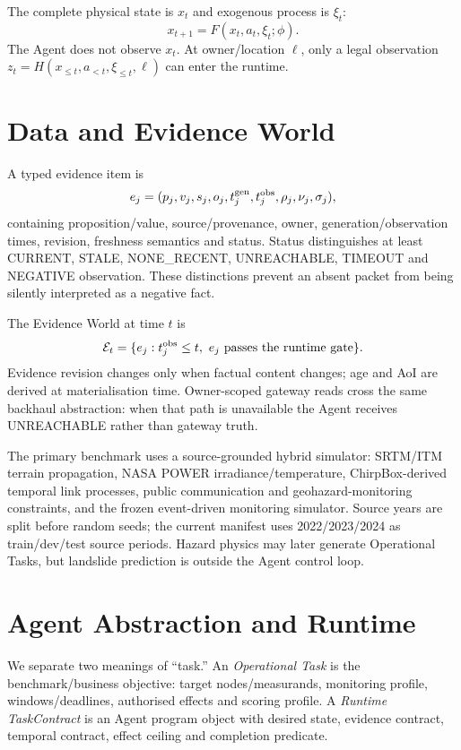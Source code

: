 \documentclass[journal,10pt]{IEEEtran}
\begin{document}
The complete physical state is $x_t$ and exogenous process is $\xi_t$:
\begin{equation}
x_{t+1}=F(x_t,a_t,\xi_t;\phi).
\label{eq:physics}
\end{equation}
The Agent does not observe $x_t$. At owner/location $\ell$, only a legal observation
$z_t=H(x_{\le t},a_{<t},\xi_{\le t},\ell)$ can enter the runtime.

\section{Data and Evidence World}
\label{sec:evidence}
A typed evidence item is
\begin{equation}
e_j=(p_j,v_j,s_j,o_j,t_j^{\rm gen},t_j^{\rm obs},\rho_j,\nu_j,\sigma_j),
\label{eq:evidence}
\end{equation}
containing proposition/value, source/provenance, owner, generation/observation times, revision,
freshness semantics and status. Status distinguishes at least CURRENT, STALE, NONE\_RECENT,
UNREACHABLE, TIMEOUT and NEGATIVE observation. These distinctions prevent an absent packet from
being silently interpreted as a negative fact.

The Evidence World at time $t$ is
\begin{equation}
\mathcal E_t=\{e_j:t_j^{\rm obs}\le t,\ e_j\text{ passes the runtime gate}\}.
\end{equation}
Evidence revision changes only when factual content changes; age and AoI are derived at
materialisation time. Owner-scoped gateway reads cross the same backhaul abstraction: when that
path is unavailable the Agent receives UNREACHABLE rather than gateway truth.

The primary benchmark uses a source-grounded hybrid simulator: SRTM/ITM terrain propagation,
NASA POWER irradiance/temperature, ChirpBox-derived temporal link processes, public communication
and geohazard-monitoring constraints, and the frozen event-driven monitoring simulator. Source
years are split before random seeds; the current manifest uses 2022/2023/2024 as train/dev/test
source periods. Hazard physics may later generate Operational Tasks, but landslide prediction is
outside the Agent control loop.

\section{Agent Abstraction and Runtime}
\label{sec:runtime}
We separate two meanings of ``task.'' An \emph{Operational Task} is the benchmark/business
objective: target nodes/measurands, monitoring profile, windows/deadlines, authorised effects and
scoring profile. A \emph{Runtime TaskContract} is an Agent program object with desired state,
evidence contract, temporal contract, effect ceiling and completion predicate.
\end{document}
